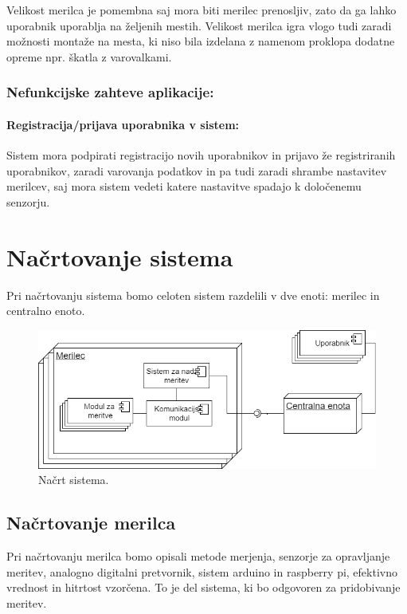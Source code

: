 \documentclass[12pt,a4paper,titlepage,openany]{report}
\begin{document}
Velikost merilca je pomembna saj mora biti merilec prenosljiv, zato da ga lahko uporabnik uporablja na željenih mestih. Velikost merilca igra vlogo tudi zaradi možnosti montaže na mesta, ki niso bila izdelana z namenom proklopa dodatne opreme npr. škatla z varovalkami. 

\subsection{Nefunkcijske zahteve aplikacije:}


\subsubsection{Registracija/prijava uporabnika v sistem:}

Sistem mora podpirati registracijo novih uporabnikov in prijavo že registriranih uporabnikov, zaradi varovanja podatkov in pa tudi zaradi shrambe nastavitev merilcev, saj mora sistem vedeti katere nastavitve spadajo k določenemu senzorju.

\chapter{Načrtovanje sistema}
\thispagestyle{fancy}
Pri načrtovanju sistema bomo celoten sistem razdelili v dve enoti: merilec in centralno enoto.
\begin{figure}[H]
\begin{center}
\includegraphics[width=1\linewidth]{Slike/NacrtSistema.png}
\end{center}
\caption{Načrt sistema.}\label{slika:NacrtSistema}
\end{figure}

\section{Načrtovanje merilca}
\thispagestyle{fancy}
Pri načrtovanju merilca bomo opisali metode merjenja, senzorje za opravljanje meritev, analogno digitalni pretvornik, sistem arduino in raspberry pi, efektivno vrednost in hitrtost vzorčena. To je del sistema, ki bo odgovoren za pridobivanje meritev.
\end{document}
